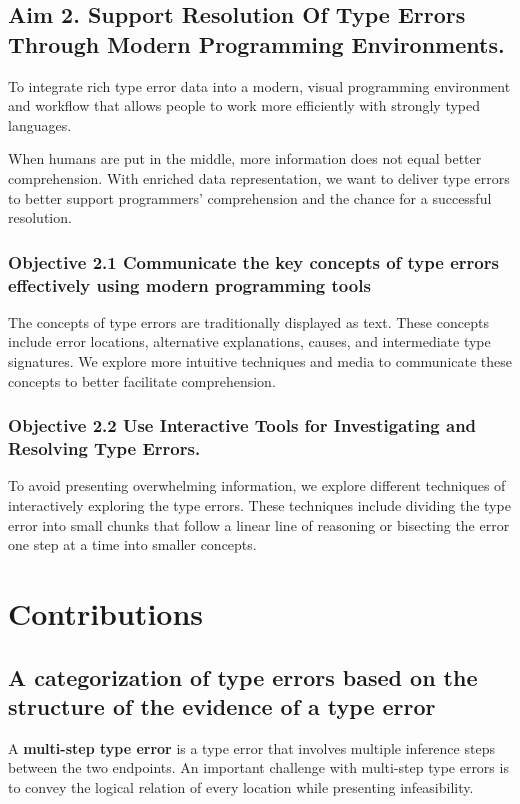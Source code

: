 \subsection{Aim 2. Support Resolution Of Type Errors Through Modern Programming Environments.}

To integrate rich type error data into a modern, visual programming environment and workflow that allows people to work more efficiently with strongly typed languages.


When humans are put in the middle, more information does not equal better comprehension. With enriched data representation, we want to deliver type errors to better support programmers’ comprehension and the chance for a successful resolution.

\subsubsection{Objective 2.1 Communicate the key concepts of type errors effectively using modern programming tools}

The concepts of type errors are traditionally displayed as text. These concepts include error locations, alternative explanations, causes, and intermediate type signatures. We explore more intuitive techniques and media to communicate these concepts to better facilitate comprehension.

\subsubsection{Objective 2.2 Use Interactive Tools for Investigating and Resolving Type Errors.}

To avoid presenting overwhelming information, we explore different techniques of interactively exploring the type errors. These techniques include dividing the type error into small chunks that follow a linear line of reasoning or bisecting the error one step at a time into smaller concepts.


\section{Contributions}

\subsection{A categorization of type errors based on the structure of the evidence of a type error}

A \textbf{multi-step type error} is a type error that involves multiple inference steps between the two endpoints. An important challenge with multi-step type errors is to convey the logical relation of every location while presenting infeasibility. 

